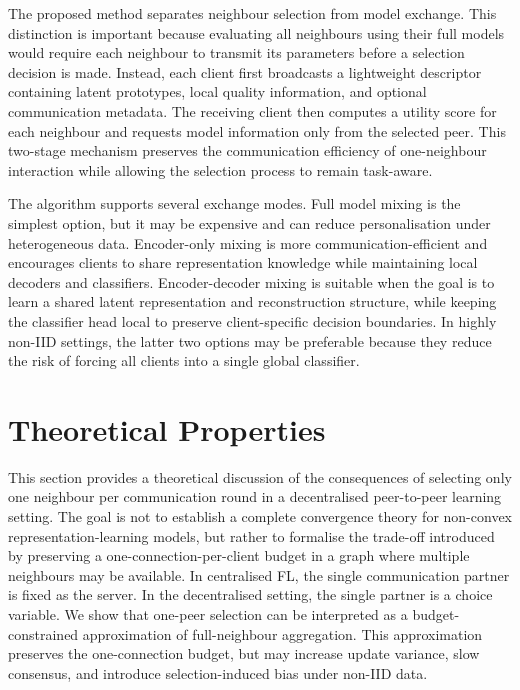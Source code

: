 \documentclass[conference]{IEEEtran}
\begin{document}
The proposed method separates neighbour selection from model exchange. This distinction is important because evaluating all neighbours using their full models would require each neighbour to transmit its parameters before a selection decision is made. Instead, each client first broadcasts a lightweight descriptor containing latent prototypes, local quality information, and optional communication metadata. The receiving client then computes a utility score for each neighbour and requests model information only from the selected peer. This two-stage mechanism preserves the communication efficiency of one-neighbour interaction while allowing the selection process to remain task-aware.

The algorithm supports several exchange modes. Full model mixing is the simplest option, but it may be expensive and can reduce personalisation under heterogeneous data. Encoder-only mixing is more communication-efficient and encourages clients to share representation knowledge while maintaining local decoders and classifiers. Encoder-decoder mixing is suitable when the goal is to learn a shared latent representation and reconstruction structure, while keeping the classifier head local to preserve client-specific decision boundaries. In highly non-IID settings, the latter two options may be preferable because they reduce the risk of forcing all clients into a single global classifier.

\section{Theoretical Properties}
\label{sec:theory}

This section provides a theoretical discussion of the consequences of selecting only one neighbour per communication round in a decentralised peer-to-peer learning setting. The goal is not to establish a complete convergence theory for non-convex representation-learning models, but rather to formalise the trade-off introduced by preserving a one-connection-per-client budget in a graph where multiple neighbours may be available. In centralised FL, the single communication partner is fixed as the server. In the decentralised setting, the single partner is a choice variable. We show that one-peer selection can be interpreted as a budget-constrained approximation of full-neighbour aggregation. This approximation preserves the one-connection budget, but may increase update variance, slow consensus, and introduce selection-induced bias under non-IID data.
\end{document}
